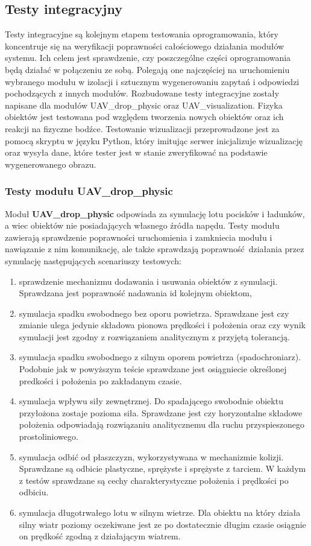 \documentclass[15pt]{sprawozdanie}
\begin{document}
\subsection{Testy integracyjny}

Testy integracyjne są kolejnym etapem testowania oprogramowania, który koncentruje się na weryfikacji poprawności całościowego działania modułów systemu. Ich celem jest sprawdzenie, czy poszczególne części oprogramowania będą działać w połączeniu ze sobą. Polegają one najczęściej na uruchomieniu wybranego modułu w izolacji i sztucznym wygenerowaniu zapytań i odpowiedzi pochodzących z innych modułów. Rozbudowane testy integracyjne zostały napisane dla modułów UAV\_drop\_physic oraz UAV\_visualization. Fizyka obiektów jest testowana pod względem tworzenia nowych obiektów oraz ich reakcji na fizyczne bodźce. Testowanie wizualizacji przeprowadzone jest za pomocą skryptu w języku Python, który imitując serwer inicjalizuje wizualizację oraz wysyła dane, które tester jest w stanie zweryfikować na podstawie wygenerowanego obrazu.

\subsubsection{Testy modułu UAV\_drop\_physic}

Moduł \textbf{UAV\_drop\_physic} odpowiada za symulację lotu pocisków i ładunków, a wiec obiektów nie posiadających własnego źródła napędu. Testy modułu zawierają sprawdzenie poprawności uruchomienia i zamkniecia modułu i nawiązanie z nim komunikację, ale także sprawdzają poprawność działania przez symulację następujących scenariuszy testowych:

\begin{enumerate}
\item sprawdzenie mechanizmu dodawania i usuwania obiektów z symulacji. Sprawdzana jest poprawność nadawania id kolejnym obiektom,
\item symulacja spadku swobodnego bez oporu powietrza. Sprawdzane jest czy zmianie ulega jedynie składowa pionowa prędkości i położenia oraz czy wynik symulacji jest zgodny z rozwiązaniem analitycznym z przyjętą tolerancją.
\item symulacja spadku swobodnego z silnym oporem powietrza (spadochroniarz). Podobnie jak w powyższym teście sprawdzane jest osiągniecie określonej predkości i położenia po zakładanym czasie.
\item symulacja wpływu siły zewnętrznej. Do spadającego swobodnie obiektu przyłożona zostaje pozioma siła. Sprawdzane jest czy horyzontalne składowe położenia odpowiadają rozwiązaniu analitycznemu dla ruchu przyspieszonego prostoliniowego.
\item symulacja odbić od płaszczyzn, wykorzystywana w mechanizmie kolizji. Sprawdzane są odbicie plastyczne, sprężyste i sprężyste z tarciem. W każdym z testów sprawdzane są cechy charakterystyczne położenia i prędkości po odbiciu.
\item symulacja długotrwałego lotu w silnym wietrze. Dla obiektu na który działa silny wiatr poziomy oczekiwane jest ze po dostatecznie długim czasie osiągnie on prędkość zgodną z działającym wiatrem. 
\end{enumerate}
\end{document}
